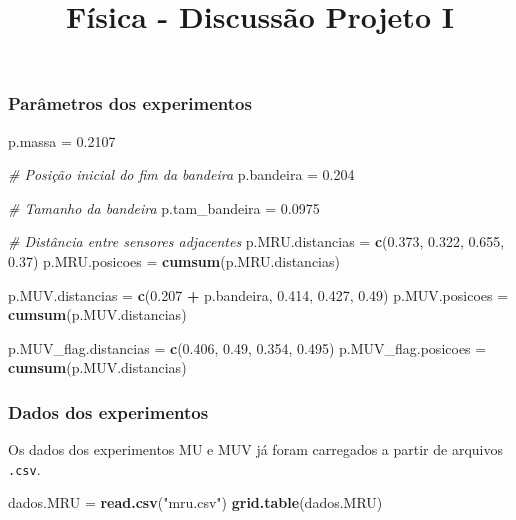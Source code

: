 \documentclass[]{article}
\title{Física - Discussão Projeto I}
\author{}
\date{}
\newenvironment{Shaded}{\begin{snugshade}}{\end{snugshade}}
\newcommand{\KeywordTok}[1]{\textcolor[rgb]{0.13,0.29,0.53}{\textbf{#1}}}
\newcommand{\FloatTok}[1]{\textcolor[rgb]{0.00,0.00,0.81}{#1}}
\newcommand{\StringTok}[1]{\textcolor[rgb]{0.31,0.60,0.02}{#1}}
\newcommand{\CommentTok}[1]{\textcolor[rgb]{0.56,0.35,0.01}{\textit{#1}}}
\newcommand{\OperatorTok}[1]{\textcolor[rgb]{0.81,0.36,0.00}{\textbf{#1}}}
\newcommand{\NormalTok}[1]{#1}
\begin{document}
\maketitle

\subsubsection{Parâmetros dos
experimentos}\label{parametros-dos-experimentos}

\begin{Shaded}
\begin{Highlighting}[]
\NormalTok{p.massa =}\StringTok{ }\FloatTok{0.2107}

\CommentTok{# Posição inicial do fim da bandeira}
\NormalTok{p.bandeira =}\StringTok{ }\FloatTok{0.204}

\CommentTok{# Tamanho da bandeira}
\NormalTok{p.tam_bandeira =}\StringTok{ }\FloatTok{0.0975}

\CommentTok{# Distância entre sensores adjacentes}
\NormalTok{p.MRU.distancias =}\StringTok{ }\KeywordTok{c}\NormalTok{(}\FloatTok{0.373}\NormalTok{, }\FloatTok{0.322}\NormalTok{, }\FloatTok{0.655}\NormalTok{, }\FloatTok{0.37}\NormalTok{)}
\NormalTok{p.MRU.posicoes =}\StringTok{ }\KeywordTok{cumsum}\NormalTok{(p.MRU.distancias)}


\NormalTok{p.MUV.distancias =}\StringTok{ }\KeywordTok{c}\NormalTok{(}\FloatTok{0.207} \OperatorTok{+}\StringTok{ }\NormalTok{p.bandeira, }\FloatTok{0.414}\NormalTok{, }\FloatTok{0.427}\NormalTok{, }\FloatTok{0.49}\NormalTok{)}
\NormalTok{p.MUV.posicoes =}\StringTok{ }\KeywordTok{cumsum}\NormalTok{(p.MUV.distancias)}

\NormalTok{p.MUV_flag.distancias =}\StringTok{ }\KeywordTok{c}\NormalTok{(}\FloatTok{0.406}\NormalTok{, }\FloatTok{0.49}\NormalTok{, }\FloatTok{0.354}\NormalTok{, }\FloatTok{0.495}\NormalTok{)}
\NormalTok{p.MUV_flag.posicoes =}\StringTok{ }\KeywordTok{cumsum}\NormalTok{(p.MUV.distancias)}
\end{Highlighting}
\end{Shaded}

\subsubsection{Dados dos experimentos}\label{dados-dos-experimentos}

Os dados dos experimentos MU e MUV já foram carregados a partir de
arquivos \texttt{.csv}.

\begin{Shaded}
\begin{Highlighting}[]
\NormalTok{dados.MRU =}\StringTok{ }\KeywordTok{read.csv}\NormalTok{(}\StringTok{"mru.csv"}\NormalTok{)}
\KeywordTok{grid.table}\NormalTok{(dados.MRU)}
\end{Highlighting}
\end{Shaded}
\end{document}
